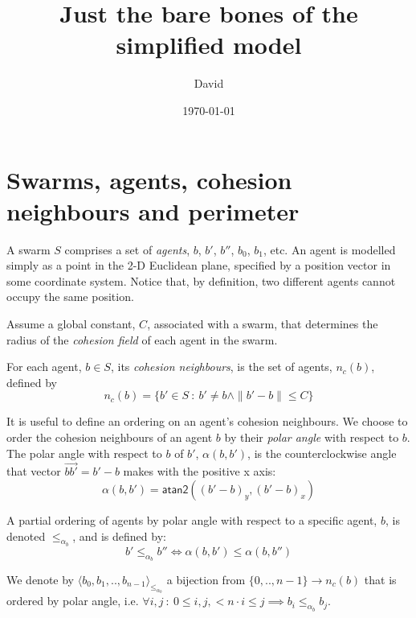 \documentclass[12pt,a4paper]{article}
\title{Just the bare bones of the simplified model}
\author{David}
\date{\today}
\renewcommand{\vec}[1]{\overrightarrow{#1}}
\newcommand{\pangle}{\mathit{\alpha}}
\newcommand{\leqaz}[3]{#2 \leq_{\pangle_#1} #3}
\newcommand{\angleordered}[2]{\langle #2 \rangle_{\leqaz{#1}{}{}}}
\begin{document}
\maketitle

\section{Swarms, agents, cohesion neighbours and perimeter}
A swarm $S$ comprises a set of \emph{agents}, $b$, $b'$, $b''$, $b_0$, $b_1$, etc.
An agent is modelled simply as a point in the 2-D Euclidean plane, specified by
a position vector in some coordinate system. Notice that, by definition, two
different agents cannot occupy the same position.

Assume a global constant, $C$, associated with a swarm, that
determines the radius of the \emph{cohesion field} of each agent in the swarm. 

For each agent, $b \in S$, its \emph{cohesion neighbours}, is the set of
agents, $n_c(b)$, defined by 
\begin{equation}\label{eq:c_nbrs}
n_c(b) = \{b' \in S~:~b' \neq b \land \|b' - b\| \leq C\}
\end{equation}

It is useful to define an ordering on an agent's cohesion neighbours.  We
choose to order the cohesion neighbours of an agent $b$ by their \emph{polar
angle} with respect to $b$. The polar angle with respect to $b$ of $b'$,
$\pangle(b, b')$, is the counterclockwise angle that vector $\vec{bb'} = b' -
b$ makes with the positive x axis:
\begin{equation}\label{eq:pangle}
	\pangle(b, b') = \mathsf{atan2}((b'-b)_y, (b'-b)_x)
\end{equation} 

A partial ordering of agents by polar angle with respect to a specific agent,
$b$, is denoted $\leqaz{b}{}{}$, and is defined by: 
\begin{equation}\label{angle_ordering}
	\leqaz{b}{b'}{b''} \iff \pangle(b, b') \leq \pangle(b, b'')
\end{equation}

We denote by $\angleordered{b}{b_0, b_1, .., b_{n-1}}$ a bijection from $\{0,
.., n-1\} \rightarrow n_c(b)$ that is ordered by polar angle, i.e. $\forall i,
j~:~0 \leq i, j, < n \cdot i \leq j \implies \leqaz{b}{b_i}{b_j}$.
\end{document}
